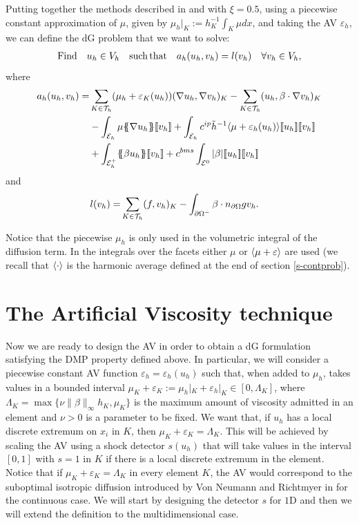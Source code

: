  
Putting together the methods described in  and  with $\xi=0.5$, using a piecewise constant approximation of $\mu$, given by $\mu_h|_K := h^{-1}_K \int_K \mu dx$, and taking the AV $\varepsilon_h$, we can define the dG problem that we want to solve: 
\begin{align}\label{eq-dscrtpbm}
{\rm Find}\quad u_h\in V_h \quad {\rm such}\,{\rm that }\quad a_h(u_h,v_h) = l(v_h) \quad \forall v_h\in V_h,
\end{align}
where
\begin{align}\label{eq-bform}
a_h(u_h,v_h) = & \displaystyle\sum\limits_{K\in \thn} (\mu_h + \varepsilon_K(u_h)) ( \nabla u_h, \nabla v_{h})_K - 
\displaystyle\sum\limits_{K\in \thn} ( u_h,  \beta \cdot \nabla v_{h})_K \\
 & - \int_{\mathcal{E}_h} \mu \mean{\nabla u_h} \jump{v_h}   +  \int_{ \mathcal{E}_h} c^{ip} \tilde{h}^{-1} \meanhar{\mu+\varepsilon_h(u_h)}\jump{  u_{h}}\jump{  v_{h}}  \nonumber \\
 &+ \int_{\mathcal{E}_h^+}   \mean{\beta u_h}\jump{v_h} + c^{bms} \int_{ \mathcal{E}^0}  |\beta|  \jump{u_h} \jump{v_h} \nonumber
\end{align}
and 
\begin{align*}
l(v_h) = & \displaystyle\sum\limits_{K\in \mathcal{T}_h} (f,v_h)_K - \int_{\partial \Omega^-} \beta \cdot n_{\partial\Omega}g v_h.
\end{align*}

{Notice that the piecewise $\mu_h$ is only used in the volumetric integral of the diffusion term. In the integrals over the facets either $\mu$ or $\langle\mu+\varepsilon\rangle$ are used} { (we recall that $\langle\cdot\rangle$ is the harmonic average defined at the end of section \ref{s-contprob})}.
\section{The Artificial Viscosity technique}\label{s-ad}

Now we are ready to design the AV in order to obtain a dG formulation satisfying the DMP property defined above. In particular, we will consider a piecewise constant AV function $\varepsilon_h=\varepsilon_h(u_h)$ such that, when added to $\mu_h$, takes values in a bounded interval $\mu_K + \varepsilon_K := \mu_h|_K + \varepsilon_h|_K\in [0,\Lambda_K]$, where $\Lambda_K=\max\{\nu \|\beta\|_\infty h_{K},\mu_K\}$ is the maximum amount of viscosity admitted in an element and $\nu>0$ is a parameter to be fixed. We want that, if $u_h$ has a local discrete extremum on $x_i$ in $K$, then  $\mu_{K}+ \varepsilon_{K} = \Lambda_{K}$. This will be achieved by scaling the AV using a shock detector $s(u_h)$ that will take values in the interval $[0,1]$ with $s=1$ in $K$ if there is a local discrete extremum in the element. { Notice that if $\mu_K+\varepsilon_K = \Lambda_K$ in every element $K$, the AV would correspond to the suboptimal isotropic diffusion introduced by Von Neumann and Richtmyer in \cite{von_neumann_method_1950} for the continuous case}. We will start by designing the detector $s$ for $1$D and then we will extend the definition to the multidimensional case.

